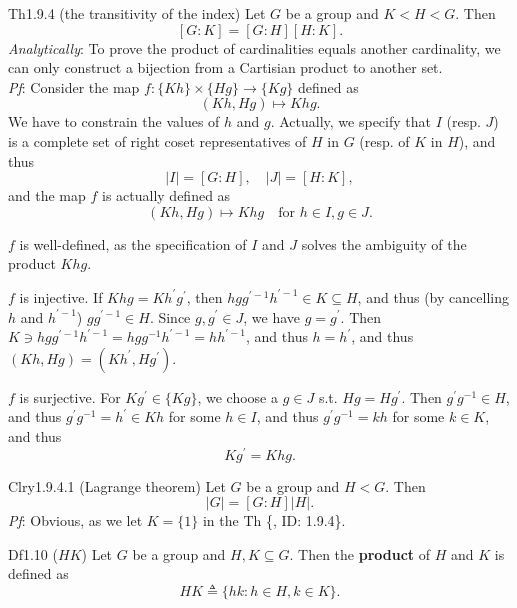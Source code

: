\documentclass{article}
\begin{document}
\begin{Th}{Th1.9.4 (the transitivity of the index)}
    Let $G$ be a group and $K<H<G$. Then
    $$ [G:K] = [G:H][H:K]. $$
    \tcblower
    \textcolor{P}{\textit{Analytically}: To prove the product of cardinalities equals another cardinality, we can only construct a bijection from a Cartisian product to another set.} \\
    \textit{Pf}: Consider the map $f: \{Kh\}\times\{Hg\}\to \{Kg\}$ defined as
    $$ (Kh, Hg)\mapsto Khg. $$
    We have to constrain the values of $h$ and $g$. Actually, we specify that $I$ (resp. $J$) is a complete set of right coset representatives of $H$ in $G$ (resp. of $K$ in $H$), and thus
    $$ |I| = [G:H], \quad |J| = [H:K], $$
    and the map $f$ is actually defined as 
    $$ (Kh, Hg)\mapsto Khg \quad \text{for } h\in I, g\in J. $$
    \begin{compactenum}
        \item $f$ is well-defined, as the specification of $I$ and $J$ solves the ambiguity of the product $Khg$.
        \item $f$ is injective. If $Khg = Kh^\prime g^\prime$, then $hgg^{\prime-1}h^{\prime-1}\in K\subseteq H$, and thus (by cancelling $h$ and $h^{\prime-1}$) $gg^{\prime-1}\in H$. Since $g, g^\prime\in J$, we have $g = g^\prime$. Then $K\ni hgg^{\prime-1}h^{\prime-1} = hgg^{-1}h^{\prime-1} = hh^{\prime-1}$, and thus $h = h^\prime$, and thus $(Kh, Hg) = (Kh^\prime, Hg^\prime)$.
        \item $f$ is surjective. For $Kg^\prime\in\{Kg\}$, we choose a $g\in J$ s.t. $Hg = Hg^\prime$. Then $g^\prime g^{-1}\in H$, and thus $g^\prime g^{-1} = h^\prime \in Kh$ for some $h\in I$, and thus $g^\prime g^{-1} = kh$ for some $k\in K$, and thus
        $$ Kg^\prime = Khg. $$
    \end{compactenum}
\end{Th}

\begin{Th}{Clry1.9.4.1 (Lagrange theorem)}
    Let $G$ be a group and $H<G$. Then
    $$ |G| = [G:H]|H|. $$
    \tcblower
    \textit{Pf}: Obvious, as we let $K = \{1\}$ in the Th \{, ID: 1.9.4\}.
\end{Th}

\begin{Df}{Df1.10 ($HK$)}
    Let $G$ be a group and $H, K\subseteq G$. Then the \textbf{product} of $H$ and $K$ is defined as
    $$ HK \triangleq \{hk: h\in H, k\in K\}. $$
\end{Df}
\end{document}
